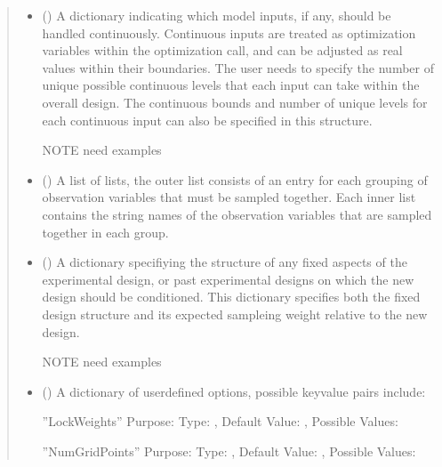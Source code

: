 \documentclass[letterpaper,10pt,english,openany,oneside]{sphinxmanual}
\begin{document}
\begin{fulllineitems}
\begin{fulllineitems}
\begin{quote}
\begin{description}
\begin{itemize}
\item {} 
 (\sphinxstyleliteralemphasis{\sphinxupquote{, }}) \textendash{} 
A dictionary indicating which
model inputs, if any, should be handled continuously. Continuous inputs are treated
as optimization variables within the optimization call, and can be adjusted as real
values within their boundaries. The user needs to specify the number of unique possible
continuous levels that each input can take within the overall design. The continuous
bounds and number of unique levels for each continuous input can also be specified in
this structure.

NOTE\textendash{} need examples


\item {} 
 () \textendash{} A list of lists, the outer list consists of
an entry for each grouping of observation variables that must be sampled together.
Each inner list contains the string names of the observation variables that are sampled
together in each group.

\item {} 
 () \textendash{} 
A dictionary specifiying the structure of any fixed aspects
of the experimental design, or past experimental designs on which the new design
should be conditioned. This dictionary specifies both the fixed design structure and
its expected sampleing weight relative to the new design.

NOTE\textendash{} need examples


\item {} 
 (\sphinxstyleliteralemphasis{\sphinxupquote{, }}) \textendash{} 
A dictionary of user\sphinxhyphen{}defined options, possible key\sphinxhyphen{}value pairs
include:

”LockWeights” \textendash{}
Purpose:
Type: ,
Default Value: ,
Possible Values:

”NumGridPoints” \textendash{}
Purpose:
Type: ,
Default Value: ,
Possible Values:


\end{itemize}


\end{description}
\end{quote}
\end{fulllineitems}
\end{fulllineitems}
\end{document}
